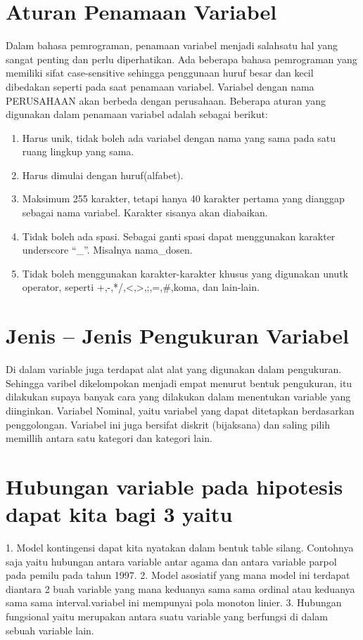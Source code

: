 \section{Aturan Penamaan Variabel}
Dalam bahasa pemrograman, penamaan variabel menjadi salahsatu hal yang sangat penting dan perlu diperhatikan. 
Ada beberapa bahasa pemrograman yang memiliki sifat case-sensitive sehingga penggunaan huruf besar dan kecil dibedakan seperti pada saat penamaan variabel. Variabel dengan nama PERUSAHAAN akan berbeda dengan perusahaan. 
Beberapa aturan yang  digunakan dalam penamaan variabel adalah sebagai berikut:
\begin{enumerate}
\item Harus unik, tidak boleh ada variabel dengan nama yang sama pada satu ruang lingkup yang sama.
\item Harus dimulai dengan huruf(alfabet).
\item Maksimum 255 karakter, tetapi hanya 40 karakter pertama yang dianggap sebagai nama variabel. Karakter sisanya akan diabaikan.
\item Tidak boleh ada spasi. Sebagai ganti spasi dapat menggunakan karakter underscore “_”. Misalnya nama_dosen.
\item Tidak boleh menggunakan karakter-karakter khusus yang digunakan unutk operator, seperti +,-,*/,<,>,;,=,#,koma, dan lain-lain.
\end{enumerate}

\section{Jenis – Jenis Pengukuran Variabel}
Di dalam variable juga terdapat alat alat yang digunakan dalam pengukuran. Sehingga varibel dikelompokan menjadi empat menurut bentuk   
pengukuran, itu dilakukan supaya banyak cara yang dilakukan dalam menentukan variable yang diinginkan. Variabel Nominal, yaitu variabel
yang dapat ditetapkan berdasarkan penggolongan. Variabel ini juga bersifat diskrit (bijaksana) dan saling pilih memillih antara satu 
kategori dan kategori lain.

\section{Hubungan variable pada hipotesis dapat kita bagi 3 yaitu}
1.	Model kontingensi dapat kita nyatakan dalam bentuk table silang. Contohnya saja yaitu hubungan antara variable antar agama dan antara 
variable parpol pada pemilu pada tahun 1997. 
2.	Model asosiatif yang mana model ini terdapat diantara 2 buah variable yang mana keduanya sama sama ordinal atau keduanya sama sama 
interval.variabel ini mempunyai pola monoton linier.
3.	Hubungan fungsional yaitu merupakan antara suatu variable yang berfungsi di dalam sebuah variable lain.


